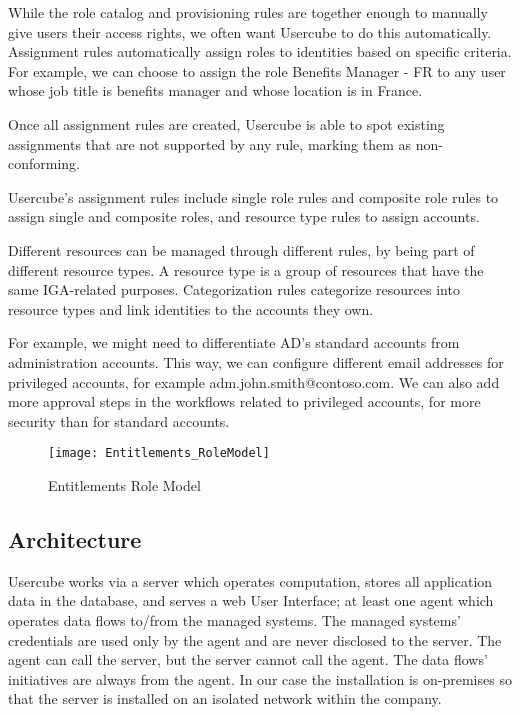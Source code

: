 While the role catalog and provisioning rules are together enough to manually give users their access rights, we often want Usercube to do this automatically. Assignment rules automatically assign roles to identities based on specific criteria. For example, we can choose to assign the role Benefits Manager - FR to any user whose job title is benefits manager and whose location is in France.

Once all assignment rules are created, Usercube is able to spot existing assignments that are not supported by any rule, marking them as non-conforming.

Usercube’s assignment rules include single role rules and composite role rules to assign single and composite roles, and resource type rules to assign accounts.

Different resources can be managed through different rules, by being part of different resource types. A resource type is a group of resources that have the same IGA-related purposes. Categorization rules categorize resources into resource types and link identities to the accounts they own.

For example, we might need to differentiate AD’s standard accounts from administration accounts. This way, we can configure different email addresses for privileged accounts, for example adm.john.smith@contoso.com. We can also add more approval steps in the workflows related to privileged accounts, for more security than for standard accounts.

\begin{figure}[htbp]
  \centering
  \texttt{[image: Entitlements\_RoleModel]}
  \caption{Entitlements Role Model}
  \label{fig:Entitlements_RoleModel}
\end{figure}



\subsection{Architecture}


Usercube works via a server which operates computation, stores all application data in the database, and serves a web User Interface; at least one agent which operates data flows to/from the managed systems. The managed systems' credentials are used only by the agent and are never disclosed to the server. The agent can call the server, but the server cannot call the agent. The data flows' initiatives are always from the agent. In our case the installation is on-premises so that the server is installed on an isolated network within the company.

